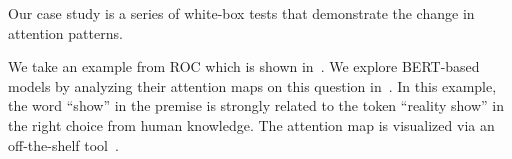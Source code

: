 

Our case study is a series of white-box tests that demonstrate
the change in attention patterns.

We take an example from ROC which is shown in~.
We explore BERT-based models by 
analyzing their attention maps on this question in~.  
In this example, the word ``show'' in the premise is strongly
related to the token ``reality show'' in the right choice from human knowledge. 
The attention map is visualized via an off-the-shelf tool~\cite{vig-2019-multiscale}.


